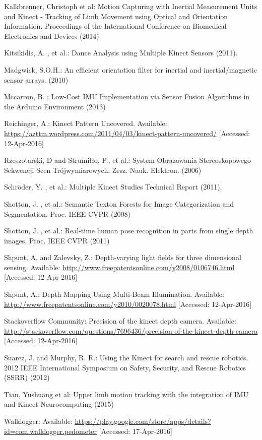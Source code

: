 \documentclass{llncs}
\begin{document}
\begin{thebibliography}{5}
	Kalkbrenner, Christoph et al:
	Motion Capturing with Inertial Measurement Units and Kinect - Tracking of Limb Movement using Optical and Orientation Information.
	Proceedings of the International Conference on Biomedical Electronics and Devices (2014)
			
	Kitsikidis, A. , et al.:
	Dance Analysis using Multiple Kinect Sensors (2011).

	Madgwick, S.O.H.:
	An efficient orientation filter for inertial and inertial/magnetic sensor arrays. (2010)
	
	Mccarron, B. :
	Low-Cost IMU Implementation via Sensor Fusion Algorithms in the Arduino Environment (2013)
			
	Reichinger, A.:
	Kinect Pattern Uncovered.
	Available: \url{https://azttm.wordpress.com/2011/04/03/kinect-pattern-uncovered/} [Accessed: 12-Apr-2016]
			
	Rzeszotarski, D and Strumi{\l}{\l}o, P., et al.:
	System Obrazowania Stereoskopowego Sekwencji Scen Tr{\'{o}}jwymiarowych.
	Zesz. Nauk. Elektron. (2006)

	Schr{\"{o}}der, Y. , et al.:
	Multiple Kinect Studies Technical Report (2011).
		
		Shotton, J. , et al.:
		Semantic Texton Forests for Image Categorization and Segmentation.		
		Proc. IEEE CVPR (2008)		
		
	Shotton, J. , et al.:
	Real-time human pose recognition in parts from single depth images.		
		Proc. IEEE CVPR (2011)	
				
	Shpunt, A. and Zalevsky, Z.:
	Depth-varying light fields for three dimensional sensing.
	Available: \url{http://www.freepatentsonline.com/y2008/0106746.html} [Accessed: 12-Apr-2016]
				
	Shpunt, A.:
	Depth Mapping Using Multi-Beam Illumination.
	Available: \url{http://www.freepatentsonline.com/y2010/0020078.html} [Accessed: 12-Apr-2016]

	Stackoverflow Community:
	Precision of the kinect depth camera.
	Available: \url{http://stackoverflow.com/questions/7696436/precision-of-the-kinect-depth-camera} [Accessed: 12-Apr-2016]

	Suarez, J. and Murphy, R. R.:
	Using the Kinect for search and rescue robotics.
	2012 IEEE International Symposium on Safety, Security, and Rescue Robotics (SSRR) (2012)
			
	Tian, Yushuang et al:
	Upper limb motion tracking with the integration of IMU and Kinect
	Neurocomputing (2015)
	
	Walklogger:
	Available: \url{https://play.google.com/store/apps/details?id=com.walklogger.pedometer} [Accessed: 17-Apr-2016]
	
\end{thebibliography}
\end{document}
